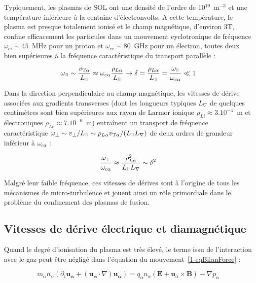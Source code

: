 \begin{refsection}
Typiquement, les plasmas de SOL ont une densité de
l'ordre de 10$^{19}$~m$^{-3}$ et une température inférieure à la centaine
d'électronvolts. A cette température, le plasma est presque totalement ionisé et
le champ magnétique, d'environ 3T, confine efficacement les particules dans un
mouvement cyclotronique de fréquence $\omega_{ci}\sim45$~MHz pour un proton et
$\omega_{ce}\sim80$~GHz pour un électron, toutes deux bien supérieures à la
fréquence caractéristique du transport parallèle :

\begin{equation}
\omega_\para\sim
\frac{v_{\text{T}\alpha}}{L_\para}\approx\omega_{c\alpha}\frac{\rho_{L\alpha}}{L_\para}\rightarrow
\delta=\frac{\rho_{L\alpha}}{L_\para}=\frac{\omega_\para}{\omega_{c\alpha}}\ll1
\end{equation} 

Dans la direction perpendiculaire au champ
magnétique, les vitesses de dérive associées aux gradients transverses (dont les longueurs
typiques $L_\nabla$ de quelques centimètres sont bien supérieures aux rayon de
Larmor ionique $\rho_{Li}\approx3.10^{-4}$~m et électroniques
$\rho_{Le}\approx7.10^{-6}$~m) entraînent un transport de fréquence
caractéristique $\omega_\perp\sim v_\perp/L_\para\sim\rho_{L\alpha}
v_{\text{T}\alpha}/(L_\para L_\nabla)$ de deux ordres de grandeur inférieur à
$\omega_{c\alpha}$ :

\begin{equation}
\frac{\omega_\perp}{\omega_{c\alpha}}\approx\frac{\rho_{L\alpha}^2}{L_\para
L_\nabla}\sim\delta^2
\end{equation}

Malgré leur faible fréquence, ces vitesses de dérives sont à l'origine de tous
les mécanismes de micro-turbulence et jouent ainsi un rôle primordiale dans le
problème du confinement des plasmas de fusion.

\subsection{Vitesses de dérive électrique et diamagnétique}

Quand le degré d'ionisation du plasma est très élevé, le terme issu de
l'interaction avec le gaz peut être négligé dans l'équation du
mouvement~\eqref{1-eqBilanForce} :

\begin{equation}
\label{1-eqSOL}
 m_\alpha n_\alpha\left(\partial_t \mathbf{u_\alpha} +
(\mathbf{u_\alpha}\cdot\nabla)\mathbf{u_\alpha}\right)
={q_\alpha n_\alpha}\left(\mathbf E+\mathbf
u_\alpha\times \mathbf B\right)
-{\nabla p_\alpha}
\end{equation}


\end{refsection}
